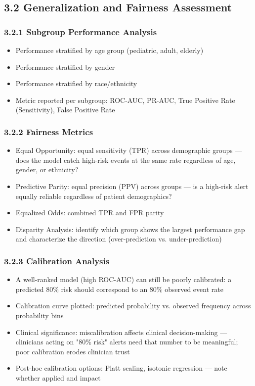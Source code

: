 \documentclass[11pt,a4paper]{article}
\begin{document}
\subsection{3.2 Generalization and Fairness Assessment}

\subsubsection{3.2.1 Subgroup Performance Analysis}
\begin{itemize}
\item Performance stratified by age group (pediatric, adult, elderly)
\item Performance stratified by gender
\item Performance stratified by race/ethnicity
\item Metric reported per subgroup: ROC-AUC, PR-AUC, True Positive Rate (Sensitivity), False Positive Rate
\end{itemize}

\subsubsection{3.2.2 Fairness Metrics}
\begin{itemize}
\item Equal Opportunity: equal sensitivity (TPR) across demographic groups --- does the model catch high-risk events at the same rate regardless of age, gender, or ethnicity?
\item Predictive Parity: equal precision (PPV) across groups --- is a high-risk alert equally reliable regardless of patient demographics?
\item Equalized Odds: combined TPR and FPR parity
\item Disparity Analysis: identify which group shows the largest performance gap and characterize the direction (over-prediction vs. under-prediction)
\end{itemize}

\subsubsection{3.2.3 Calibration Analysis}
\begin{itemize}
\item A well-ranked model (high ROC-AUC) can still be poorly calibrated: a predicted 80\% risk should correspond to an 80\% observed event rate
\item Calibration curve plotted: predicted probability vs. observed frequency across probability bins
\item Clinical significance: miscalibration affects clinical decision-making --- clinicians acting on "80\% risk" alerts need that number to be meaningful; poor calibration erodes clinician trust
\item Post-hoc calibration options: Platt scaling, isotonic regression --- note whether applied and impact
\end{itemize}
\end{document}

